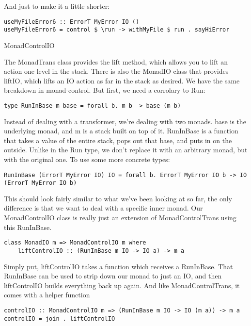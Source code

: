 And just to make it a little shorter:

\begin{lstlisting}
useMyFileError6 :: ErrorT MyError IO ()
useMyFileError6 = control $ \run -> withMyFile $ run . sayHiError
\end{lstlisting}

MonadControlIO

The MonadTrans class provides the lift method, which allows you to lift an action one level in the stack. There is also the MonadIO class that provides liftIO, which lifts an IO action as far in the stack as desired. We have the same breakdown in monad-control. But first, we need a corrolary to Run:

\begin{lstlisting}
type RunInBase m base = forall b. m b -> base (m b)
\end{lstlisting}

Instead of dealing with a transformer, we're dealing with two monads. base is the underlying monad, and m is a stack built on top of it. RunInBase is a function that takes a value of the entire stack, pops out that base, and puts in on the outside. Unlike in the Run type, we don't replace it with an arbitrary monad, but with the original one. To use some more concrete types:

\begin{lstlisting}
RunInBase (ErrorT MyError IO) IO = forall b. ErrorT MyError IO b -> IO (ErrorT MyError IO b)
\end{lstlisting}

This should look fairly similar to what we've been looking at so far, the only difference is that we want to deal with a specific inner monad. Our MonadControlIO class is really just an extension of MonadControlTrans using this RunInBase.

\begin{lstlisting}
class MonadIO m => MonadControlIO m where
    liftControlIO :: (RunInBase m IO -> IO a) -> m a
\end{lstlisting}

Simply put, liftControlIO takes a function which receives a RunInBase. That RunInBase can be used to strip down our monad to just an IO, and then liftControlIO builds everything back up again. And like MonadControlTrans, it comes with a helper function

\begin{lstlisting}
controlIO :: MonadControlIO m => (RunInBase m IO -> IO (m a)) -> m a
controlIO = join . liftControlIO
\end{lstlisting}


